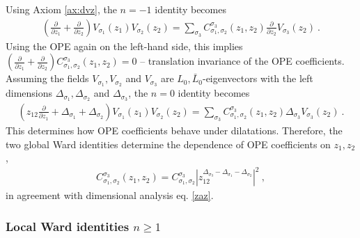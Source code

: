 \documentclass[12pt, a4paper, notitlepage, twoside]{report}
\numberwithin{equation}{section}
\theoremstyle{break}
\begin{document}
Using Axiom \ref{ax:dvz}, the $n=-1$ identity becomes 
 \begin{align}
  \left(\frac{\partial}{\partial z_1} +\frac{\partial}{\partial z_2}\right) V_{\sigma_1}(z_1)V_{\sigma_2}(z_2) = \sum_{\sigma_3} C_{\sigma_1,\sigma_2}^{\sigma_3}(z_1,z_2) \frac{\partial}{\partial z_2} V_{\sigma_3}(z_2)\ .
 \end{align}
Using the OPE again on the left-hand side, this implies $\left(\frac{\partial}{\partial z_1} +\frac{\partial}{\partial z_2}\right) C_{\sigma_1,\sigma_2}^{\sigma_3}(z_1,z_2)=0$ -- translation invariance of the OPE coefficients. 
Assuming the fields $V_{\sigma_1}, V_{\sigma_2}$ and $V_{\sigma_3}$ are  $L_0,\bar L_0$-eigenvectors with the left dimensions $\Delta_{\sigma_1}, \Delta_{\sigma_2}$ and $\Delta_{\sigma_3}$, the $n=0$ identity becomes 
\begin{align}
 \left(z_{12}\frac{\partial}{\partial z_1} + \Delta_{\sigma_1}+\Delta_{\sigma_2}\right) V_{\sigma_1}(z_1)V_{\sigma_2}(z_2) = \sum_{\sigma_3} C_{\sigma_1,\sigma_2}^{\sigma_3}(z_1,z_2) \Delta_{\sigma_3} V_{\sigma_3}(z_2)\ .
\end{align}
This determines how OPE coefficients behave under dilatations. 
Therefore, the two global Ward identities determine the dependence of OPE coefficients on $z_1,z_2$,
\begin{align}
 C_{\sigma_1,\sigma_2}^{\sigma_3}(z_1,z_2) = C_{\sigma_1,\sigma_2}^{\sigma_3} 
 \left| z_{12}^{\Delta_{{\sigma_3}}-\Delta_{\sigma_1}-\Delta_{\sigma_2}} \right|^2 
 \ ,
 \label{eq:coz}
\end{align}
in agreement with dimensional analysis eq. \eqref{zaz}.

\subsubsection{Local Ward identities $n\geq 1$}
\end{document}
